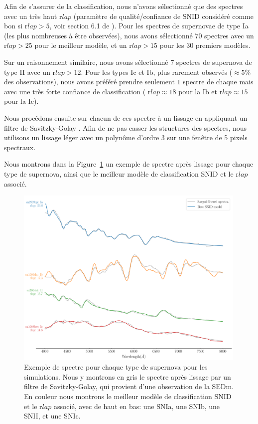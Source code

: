 \documentclass[../main/main.tex]{subfiles}
\begin{document}
Afin de s'assurer de la classification, nous n'avons sélectionné que des
spectres avec un très haut r$lap$ (paramètre de qualité/confiance de SNID considéré
comme bon si r$lap>5$, voir section 6.1 de \citet{BlondinSNID}). Pour
les spectres de supernovae de type Ia (les plus nombreuses à être observées), nous avons
sélectionné $70$ spectres avec un r$lap>25$ pour le meilleur modèle, et un r$lap>15$ pour les 30 premiers modèles.

Sur un raisonnement similaire, nous avons sélectionné $7$ spectres de
supernova de type II avec un r$lap>12$. Pour les types Ic et Ib, plus
rarement observés ($\approx5\%$ des observations), nous avons préféré
prendre seulement $1$ spectre de chaque mais avec une très forte
confiance de classification ( r$lap\approx18$ pour la Ib et r$lap\approx15$
pour la Ic).

Nous procédons ensuite sur chacun de ces spectre à un lissage en
appliquant un filtre de Savitzky-Golay \citep{SavitzkyGolay}. Afin de ne pas casser les
structures des spectres, nous utilisons un lissage léger avec un
polynôme d'ordre 3 sur une fenêtre de 5 pixels spectraux.

Nous montrons dans la Figure~\ref{fig:specsimueach} un exemple de
spectre après lissage pour chaque type de supernova, ainsi que le
meilleur modèle de classification SNID et le r$lap$ associé.

\begin{figure}[ht]
  \centering
  \includegraphics[width=0.99\textwidth]{../figures/08_simu/specsimueach.pdf}
  \caption[Exemple de spectre pour chaque type de supernova pour les
  simulations.]{Exemple de spectre pour chaque type de supernova pour
    les simulations. Nous y montrons en gris le spectre après
    lissage par un filtre de Savitzky-Golay, qui provient d'une
    observation de la SEDm. En couleur nous montrons le meilleur
  modèle de classification SNID et le r$lap$ associé, avec de haut en bas: une SNIa, une
  SNIb, une SNII, et une SNIc.}
  \label{fig:specsimueach}
\end{figure}
\end{document}
